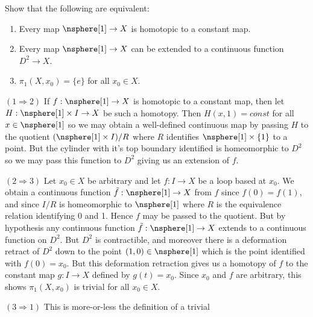     \begin{problem}
        Show that the following are equivalent:
        \begin{enumerate}
            \item Every map $\nsphere[1]\rightarrow{X}$ is homotopic to a
                constant map.
            \item Every map $\nsphere[1]\rightarrow{X}$ can be extended to a
                continuous function $D^{2}\rightarrow{X}$.
            \item $\pi_{1}(X,x_{0})=\{e\}$ for all $x_{0}\in{X}$.
        \end{enumerate}
    \end{problem}
    \begin{solution}
        $(1\Rightarrow{2})$ If $f:\nsphere[1]\rightarrow{X}$ is homotopic to a
        constant map, then let $H:\nsphere[1]\times{I}\rightarrow{X}$ be such a
        homotopy. Then $H(x,1)=const$ for all $x\in\nsphere[1]$ so we may obtain
        a well-defined continuous map by passing $H$ to the quotient
        $(\nsphere[1]\times{I})/R$ where $R$ identifies $\nsphere[1]\times\{1\}$
        to a point. But the cylinder with it's top boundary identified is
        homeomorphic to $D^{2}$ so we may pass this function to $D^{2}$ giving
        us an extension of $f$.
        \par\hfill\par
        $(2\Rightarrow{3})$ Let $x_{0}\in{X}$ be arbitrary and let
        $f:I\rightarrow{X}$ be a loop based at $x_{0}$. We obtain a continuous
        function $\tilde{f}:\nsphere[1]\rightarrow{X}$ from $f$ since
        $f(0)=f(1)$, and since $I/R$ is homeomorphic to $\nsphere[1]$
        where $R$ is the equivalence relation identifying 0 and 1. Hence $f$ may
        be passed to the quotient. But by hypothesis any continuous function
        $\tilde{f}:\nsphere[1]\rightarrow{X}$ extends to a continuous function
        on $D^{2}$. But $D^{2}$ is contractible, and moreover there is a
        deformation retract of $D^{2}$ down to the point $(1,0)\in\nsphere[1]$
        which is the point identified with $f(0)=x_{0}$.
        But this deformation retraction gives us a homotopy of
        $f$ to the constant map $g:I\rightarrow{X}$ defined by $g(t)=x_{0}$.
        Since $x_{0}$ and $f$ are arbitrary, this shows $\pi_{1}(X,x_{0})$ is
        trivial for all $x_{0}\in{X}$.
        \par\hfill\par
        $(3\Rightarrow{1})$ This is more-or-less the definition of a trivial

\end{solution}
